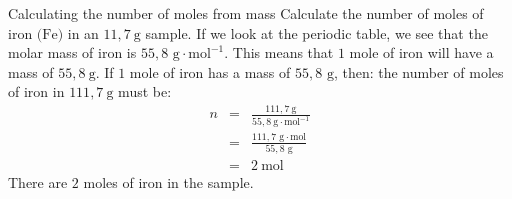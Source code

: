       \begin{wex}{Calculating the number of moles from mass }{
      \label{m38717*id276776}Calculate the number of moles of iron $\text{(Fe)}$ in an $11,7 ~\text{g}$ sample.  }
{
      \label{m38717*id276821}If we look at the periodic table, we see that the molar mass of iron is $55,8 \text{ g} \cdot \text{mol}^{-1}$. This means that $1$ mole of iron will have a mass of $55,8 ~\text{g}$.
      \label{m38717*id276848}If $1$ mole of iron has a mass of $55,8 \text{ g}$, then: the number of moles of iron in $111,7 ~\text{g}$ must be: 
\begin{eqnarray*}
n & = & \frac{111,7 ~\text{g}}{55,8 ~\text{g} \cdot{\text{mol}}^{-1}} \\
 & = & \frac{111,7 \text{ g} \cdot \text{mol}}{55,8 \text{ g}} \\
 & = & 2 ~\text{mol}
\end{eqnarray*}
There are $2$ moles of iron in the sample. 
}
    \end{wex}

